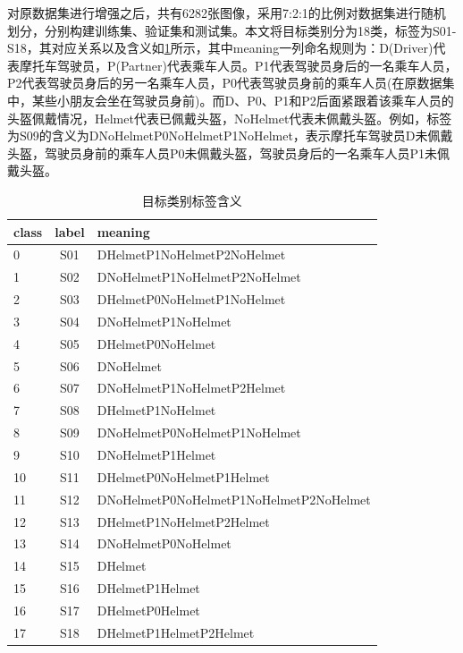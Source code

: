 对原数据集进行增强之后，共有6282张图像，采用7:2:1的比例对数据集进行随机划分，分别构建训练集、验证集和测试集。本文将目标类别分为18类，标签为S01-S18，其对应关系以及含义如\ref{tab:newlabel}所示，其中meaning一列命名规则为：D(Driver)代表摩托车驾驶员，P(Partner)代表乘车人员。P1代表驾驶员身后的一名乘车人员，P2代表驾驶员身后的另一名乘车人员，P0代表驾驶员身前的乘车人员(在原数据集中，某些小朋友会坐在驾驶员身前)。而D、P0、P1和P2后面紧跟着该乘车人员的头盔佩戴情况，Helmet代表已佩戴头盔，NoHelmet代表未佩戴头盔。例如，标签为S09的含义为DNoHelmetP0NoHelmetP1NoHelmet，表示摩托车驾驶员D未佩戴头盔，驾驶员身前的乘车人员P0未佩戴头盔，驾驶员身后的一名乘车人员P1未佩戴头盔。

\begin{table}[htb]
    \centering
    \caption[标签解释]{目标类别标签含义\label{tab:newlabel}}
    \begin{tabular}{lcl}
        \toprule
        \multicolumn{1}{c}{class} & \multicolumn{1}{c}{label} & \multicolumn{1}{l}{meaning} \\
        \midrule
        0 & S01 & DHelmetP1NoHelmetP2NoHelmet \\
        1 & S02 & DNoHelmetP1NoHelmetP2NoHelmet \\
        2 & S03 & DHelmetP0NoHelmetP1NoHelmet \\
        3 & S04 & DNoHelmetP1NoHelmet \\
        4 & S05 & DHelmetP0NoHelmet \\
        5 & S06 & DNoHelmet \\
        6 & S07 & DNoHelmetP1NoHelmetP2Helmet \\
        7 & S08 & DHelmetP1NoHelmet \\
        8 & S09 & DNoHelmetP0NoHelmetP1NoHelmet \\
        9 & S10 & DNoHelmetP1Helmet \\
        10 & S11 &  DHelmetP0NoHelmetP1Helmet \\
        11 & S12 &  DNoHelmetP0NoHelmetP1NoHelmetP2NoHelmet \\
        12 & S13 &  DHelmetP1NoHelmetP2Helmet \\
        13 & S14 &  DNoHelmetP0NoHelmet \\
        14 & S15 &  DHelmet \\
        15 & S16 &  DHelmetP1Helmet \\
        16 & S17 &  DHelmetP0Helmet \\
        17 & S18 &  DHelmetP1HelmetP2Helmet \\
        \bottomrule
    \end{tabular}
\end{table}

